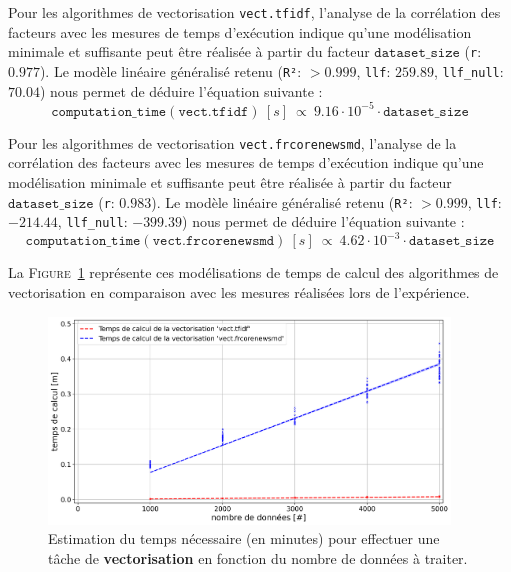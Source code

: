 			Pour les algorithmes de vectorisation \texttt{vect.tfidf}, l'analyse de la corrélation des facteurs avec les mesures de temps d'exécution indique qu'une modélisation minimale et suffisante peut être réalisée à partir du facteur $\texttt{dataset\_size}$ (\texttt{r}: $0.977$).
			Le modèle linéaire généralisé retenu (\texttt{R²}: $> 0.999$, \texttt{llf}: $259.89$, \texttt{llf\_null}: $70.04$) nous permet de déduire l'équation suivante :
			\begin{equation}
				\texttt{computation\_time}(\texttt{vect.tfidf})~[s]~
				\propto~9.16 \cdot 10^{-5} \cdot \texttt{dataset\_size}
			\end{equation}
			
			Pour les algorithmes de vectorisation \texttt{vect.frcorenewsmd}, l'analyse de la corrélation des facteurs avec les mesures de temps d'exécution indique qu'une modélisation minimale et suffisante peut être réalisée à partir du facteur $\texttt{dataset\_size}$ (\texttt{r}: $0.983$).
			Le modèle linéaire généralisé retenu (\texttt{R²}: $> 0.999$, \texttt{llf}: $-214.44$, \texttt{llf\_null}: $-399.39$) nous permet de déduire l'équation suivante :
			\begin{equation}
				\texttt{computation\_time}(\texttt{vect.frcorenewsmd})~[s]~
				\propto~4.62 \cdot 10^{-3} \cdot \texttt{dataset\_size}
			\end{equation}
			
			La \textsc{Figure~\ref{figure:4.3.2-ETUDE-COUTS-TEMPS-CALCUL-MODELISATION-VECTORIZATION}} représente ces modélisations de temps de calcul des algorithmes de vectorisation en comparaison avec les mesures réalisées lors de l'expérience.
			\newline
			\begin{figure}[!htb]
				\centering
				\includegraphics[width=0.95\textwidth]{figures/etude-temps-calcul-modelisation-2vect}
				\caption{
					Estimation du temps nécessaire (en minutes) pour effectuer une tâche de \textbf{vectorisation} en fonction du nombre de données à traiter.
				}
				\label{figure:4.3.2-ETUDE-COUTS-TEMPS-CALCUL-MODELISATION-VECTORIZATION}
			\end{figure}
			
